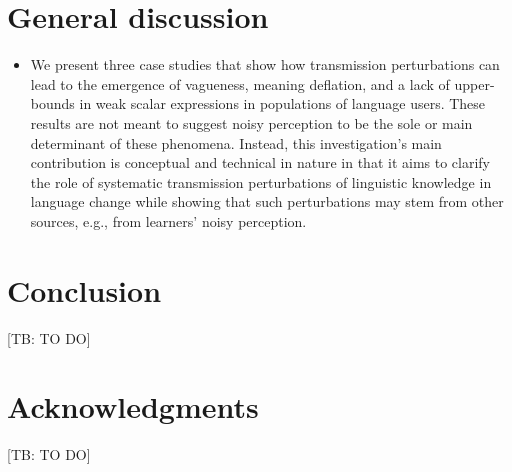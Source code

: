 \documentclass[10pt,a4paper]{article}
\newcommand{\tb}[1]{\textcolor[rgb]{.8,.33,.0}{[TB: #1]}}%
\begin{document}
\section{General discussion}


\begin{itemize}
\item We present three case studies that show how transmission perturbations can lead to the
  emergence of vagueness, meaning deflation, and a lack of upper-bounds in weak scalar
  expressions in populations of language users. These results are not meant to suggest noisy
  perception to be the sole or main determinant of these phenomena. Instead, this
  investigation's main contribution is conceptual and technical in nature in that it aims to
  clarify the role of systematic transmission perturbations of linguistic knowledge in language
  change while showing that such perturbations may stem from other sources, e.g., from
  learners' noisy perception.
\end{itemize}

\section{Conclusion}
\tb{TO DO}
\section{Acknowledgments}
\tb{TO DO}




\setlength{\bibleftmargin}{.125in}
\setlength{\bibindent}{-\bibleftmargin}


\end{document}
